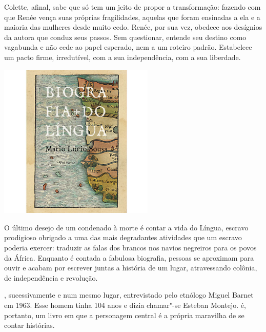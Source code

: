 \begin{multicols}{2}
Colette, afinal, sabe que só tem um jeito de propor a transformação: fazendo com que Renée vença suas próprias fragilidades, aquelas que foram ensinadas a ela e a maioria das mulheres desde muito cedo. Renée, por sua vez, obedece aos desígnios da autora que conduz seus passos. Sem questionar, entende seu destino como vagabunda e não cede ao papel esperado, nem a um roteiro padrão. Estabelece um pacto firme, irredutível, com a sua independência, com a sua liberdade.

\bigskip

\textcolor{gray}{\footnotesize{}}
\end{multicols}


\pagebreak %


\begin{center}
\hspace*{-3.6cm}
\hspace*{3.1cm}\includegraphics[width=74mm]{./grid/lingua.jpg}
\end{center}

\hspace*{-7cm}\hrulefill\hspace*{-7cm}

\medskip

\noindent{}O último desejo de um condenado à morte é contar a vida do Língua, escravo prodigioso obrigado a uma das mais degradantes atividades que um escravo poderia exercer: traduzir as falas dos brancos nos navios negreiros para os povos da África. Enquanto é contada a fabulosa biografia, pessoas se aproximam para ouvir e acabam por escrever juntas a história de um lugar, atravessando colônia, de independência e revolução.

, sucessivamente e num mesmo lugar, entrevistado pelo etnólogo Miguel Barnet em 1963. Esse homem tinha 104 anos e dizia chamar"-se Esteban Montejo. {} é, portanto, um livro em que a personagem central é a própria maravilha de se contar histórias.

